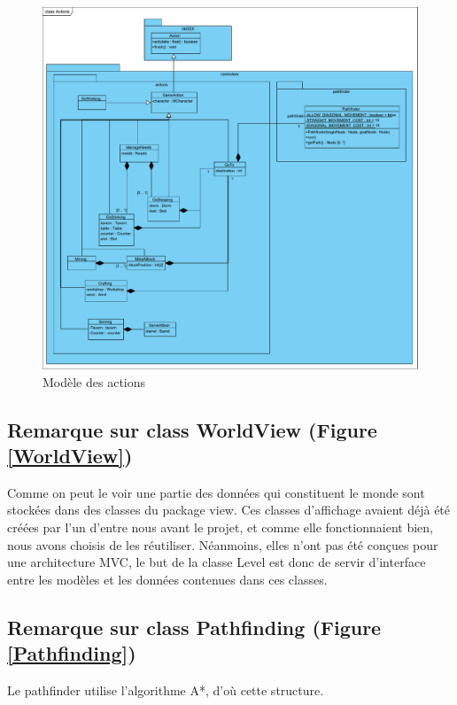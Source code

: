 \documentclass[a4paper]{report}
\begin{document}
\begin{figure}
    \center
    \includegraphics[scale=0.5]{img/class/Actions}
    \caption{Modèle des actions}
		\label{Actions}
\end{figure}

\subsection*{Remarque sur class WorldView (Figure \ref{WorldView})\\}

Comme on peut le voir une partie des données qui constituent le monde sont stockées dans des classes du package view. Ces classes d'affichage avaient déjà été créées par l'un d'entre nous avant le projet, et comme elle fonctionnaient bien, nous avons choisis de les réutiliser. Néanmoins, elles n'ont pas été conçues pour une architecture MVC, le but de la classe Level est donc de servir d'interface entre les modèles et les données contenues dans ces classes.

\subsection*{Remarque sur class Pathfinding (Figure \ref{Pathfinding})\\}

Le pathfinder utilise l'algorithme A*, d'où cette structure.
\end{document}
